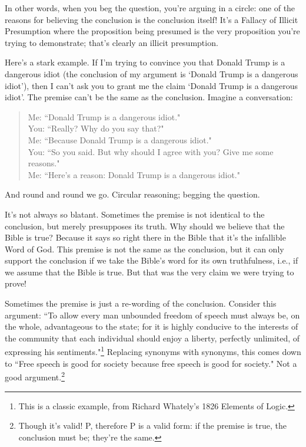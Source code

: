 In other words, when you beg the question, you're arguing in a circle: one of the reasons for
believing the conclusion is the conclusion itself! It's a Fallacy of Illicit Presumption where the
proposition being presumed is the very proposition you're trying to demonstrate; that's clearly an
illicit presumption.

Here's a stark example. If I'm trying to convince you that Donald Trump is a dangerous idiot (the
conclusion of my argument is `Donald Trump is a dangerous idiot'), then I can't ask you to grant
me the claim `Donald Trump is a dangerous idiot'. The premise can't be the same as the conclusion.
Imagine a conversation:

\begin{quote}
Me: ``Donald Trump is a dangerous idiot." \\
You: ``Really? Why do you say that?" \\
Me: ``Because Donald Trump is a dangerous idiot." \\
You: ``So you said. But why should I agree with you? Give me some reasons." \\
Me: ``Here's a reason: Donald Trump is a dangerous idiot."
\end{quote}

And round and round we go. Circular reasoning; begging the question.

It's not always so blatant. Sometimes the premise is not identical to the conclusion, but merely
presupposes its truth. Why should we believe that the Bible is true? Because it says so right there
in the Bible that it's the infallible Word of God. This premise is not the same as the conclusion,
but it can only support the conclusion if we take the Bible's word for its own truthfulness, i.e., if
we assume that the Bible is true. But that was the very claim we were trying to prove!

Sometimes the premise is just a re-wording of the conclusion. Consider this argument: ``To allow
every man unbounded freedom of speech must always be, on the whole, advantageous to the state;
for it is highly conducive to the interests of the community that each individual should enjoy a
liberty, perfectly unlimited, of expressing his 
sentiments."\footnote{This is a classic example, from Richard Whately's 1826 Elements of Logic.}
Replacing synonyms with synonyms,
this comes down to ``Free speech is good for society because free speech is good for society." Not
a good argument.\footnote{Though it's valid! P, therefore P is a valid form: if the premise is true, the conclusion must be; they're the same.}


